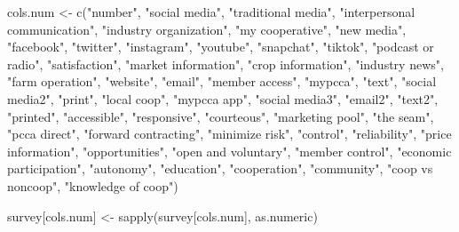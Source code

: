 \documentclass[
]{article}
\newenvironment{Shaded}{\begin{snugshade}}{\end{snugshade}}
\newcommand{\FunctionTok}[1]{\textcolor[rgb]{0.00,0.00,0.00}{#1}}
\newcommand{\NormalTok}[1]{#1}
\newcommand{\OtherTok}[1]{\textcolor[rgb]{0.56,0.35,0.01}{#1}}
\newcommand{\StringTok}[1]{\textcolor[rgb]{0.31,0.60,0.02}{#1}}
\begin{document}
\begin{Shaded}
\begin{Highlighting}[]
\NormalTok{cols.num }\OtherTok{\textless{}{-}} \FunctionTok{c}\NormalTok{(}\StringTok{"number"}\NormalTok{, }\StringTok{"social media"}\NormalTok{, }\StringTok{"traditional media"}\NormalTok{,}
    \StringTok{"interpersonal communication"}\NormalTok{, }\StringTok{"industry organization"}\NormalTok{, }\StringTok{"my cooperative"}\NormalTok{,}
    \StringTok{"new media"}\NormalTok{, }\StringTok{"facebook"}\NormalTok{, }\StringTok{"twitter"}\NormalTok{, }\StringTok{"instagram"}\NormalTok{, }\StringTok{"youtube"}\NormalTok{,}
    \StringTok{"snapchat"}\NormalTok{, }\StringTok{"tiktok"}\NormalTok{, }\StringTok{"podcast or radio"}\NormalTok{, }\StringTok{"satisfaction"}\NormalTok{,}
    \StringTok{"market information"}\NormalTok{, }\StringTok{"crop information"}\NormalTok{, }\StringTok{"industry news"}\NormalTok{,}
    \StringTok{"farm operation"}\NormalTok{, }\StringTok{"website"}\NormalTok{, }\StringTok{"email"}\NormalTok{, }\StringTok{"member access"}\NormalTok{, }\StringTok{"mypcca"}\NormalTok{,}
    \StringTok{"text"}\NormalTok{, }\StringTok{"social media2"}\NormalTok{, }\StringTok{"print"}\NormalTok{, }\StringTok{"local coop"}\NormalTok{, }\StringTok{"mypcca app"}\NormalTok{,}
    \StringTok{"social media3"}\NormalTok{, }\StringTok{"email2"}\NormalTok{, }\StringTok{"text2"}\NormalTok{, }\StringTok{"printed"}\NormalTok{, }\StringTok{"accessible"}\NormalTok{,}
    \StringTok{"responsive"}\NormalTok{, }\StringTok{"courteous"}\NormalTok{, }\StringTok{"marketing pool"}\NormalTok{, }\StringTok{"the seam"}\NormalTok{,}
    \StringTok{"pcca direct"}\NormalTok{, }\StringTok{"forward contracting"}\NormalTok{, }\StringTok{"minimize risk"}\NormalTok{, }\StringTok{"control"}\NormalTok{,}
    \StringTok{"reliability"}\NormalTok{, }\StringTok{"price information"}\NormalTok{, }\StringTok{"opportunities"}\NormalTok{, }\StringTok{"open and voluntary"}\NormalTok{,}
    \StringTok{"member control"}\NormalTok{, }\StringTok{"economic participation"}\NormalTok{, }\StringTok{"autonomy"}\NormalTok{, }\StringTok{"education"}\NormalTok{,}
    \StringTok{"cooperation"}\NormalTok{, }\StringTok{"community"}\NormalTok{, }\StringTok{"coop vs noncoop"}\NormalTok{, }\StringTok{"knowledge of coop"}\NormalTok{)}

\NormalTok{survey[cols.num] }\OtherTok{\textless{}{-}} \FunctionTok{sapply}\NormalTok{(survey[cols.num], as.numeric)}
\end{Highlighting}
\end{Shaded}
\end{document}
